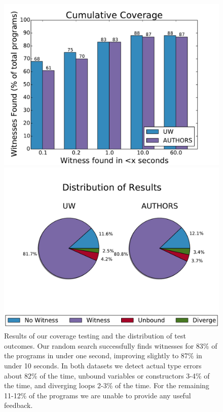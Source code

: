 \begin{figure}[t]
\centering
\begin{minipage}{\linewidth}
\includegraphics[width=\linewidth]{coverage.pdf}
\end{minipage}
\begin{minipage}{\linewidth}
\includegraphics[width=\linewidth]{distrib.pdf}
\end{minipage}
\caption{Results of our coverage testing and the distribution of test
  outcomes. Our random search successfully finds witnesses for 83\% of
  the programs in under one second, improving slightly to 87\% in under
  10 seconds. In both datasets we detect actual type errors about 82\%
  of the time, unbound variables or constructors 3-4\% of the time, and
  diverging loops 2-3\% of the time. For the remaining 11-12\% of the
  programs we are unable to provide any useful feedback.  }
\label{fig:results-witness}
\end{figure}


